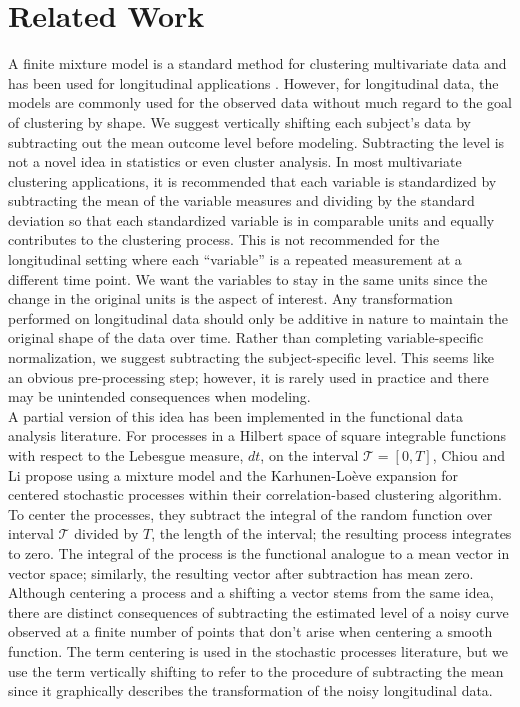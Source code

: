 \documentclass[12pt]{article}
\begin{document}
\section{Related Work}
A finite mixture model is a standard method for clustering multivariate data \cite{everitt2009} and has been used for longitudinal applications \cite{muthen2010, jones2001}. However, for longitudinal data, the models are commonly used for the observed data without much regard to the goal of clustering by shape. We suggest vertically shifting each subject's data by subtracting out the mean outcome level before modeling. Subtracting the level is not a novel idea in statistics or even cluster analysis. In most multivariate clustering applications, it is recommended that each variable is standardized by subtracting the mean of the variable measures and dividing by the standard deviation so that each standardized variable is in comparable units and equally contributes to the clustering process. This is not recommended for the longitudinal setting where each ``variable'' is a repeated measurement at a different time point. We want the variables to stay in the same units since the change in the original units is the aspect of interest. Any transformation performed on longitudinal data should only be additive in nature to maintain the original shape of the data over time. Rather than completing variable-specific normalization, we suggest subtracting the subject-specific level. This seems like an obvious pre-processing step; however, it is rarely used in practice and there may be unintended consequences when modeling.\\

A partial version of this idea has been implemented in the functional data analysis literature. For processes in a Hilbert space of square integrable functions with respect to the Lebesgue measure, $dt$, on the interval $\mathcal{T}=[0,T]$, Chiou and Li \cite{chiou2008} propose using a mixture model and the Karhunen-Lo{\`e}ve expansion for centered stochastic processes within their correlation-based clustering algorithm. To center the processes, they subtract the integral of the random function over interval $\mathcal{T}$ divided by $T$, the length of the interval; the resulting process integrates to zero. The integral of the process is the functional analogue to a mean vector in vector space; similarly, the resulting vector after subtraction has mean zero.\\

 Although centering a process and a shifting a vector stems from the same idea, there are distinct consequences of subtracting the estimated level of a noisy curve observed at a finite number of points that don't arise when centering a smooth function. The term centering is used in the stochastic processes literature, but we use the term vertically shifting to refer to the procedure of subtracting the mean since it graphically describes the transformation of the noisy longitudinal data.\\
\end{document}
